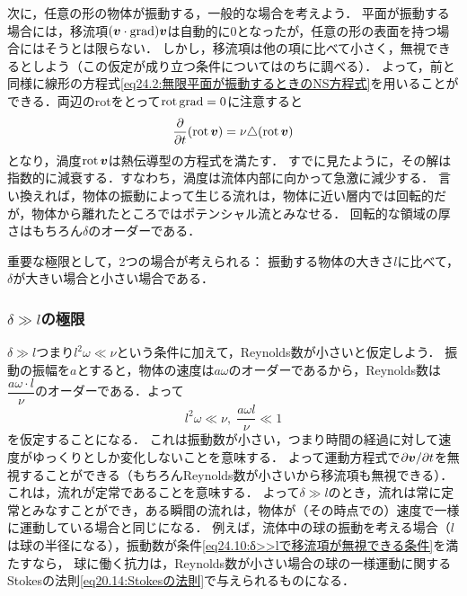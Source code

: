 次に，任意の形の物体が振動する，一般的な場合を考えよう．
平面が振動する場合には，移流項$(\vb*{v}\cdot\operatorname{grad})\vb*{v}$は自動的に0となったが，任意の形の表面を持つ場合にはそうとは限らない．
しかし，移流項は他の項に比べて小さく，無視できるとしよう（この仮定が成り立つ条件についてはのちに調べる）．
よって，前と同様に線形の方程式\eqref{eq24.2:無限平面が振動するときのNS方程式}を用いることができる．両辺のrotをとって$\operatorname{rot}\operatorname{grad}=0$に注意すると
\begin{equation}\label{eq24.9:渦度に対する熱伝導型の方程式}
    \pdv{t} (\operatorname{rot}\vb*{v}) = \nu \triangle(\operatorname{rot}\vb*{v})
\end{equation}
となり，渦度$\operatorname{rot}\vb*{v}$は熱伝導型の方程式を満たす．
すでに見たように，その解は指数的に減衰する．すなわち，渦度は流体内部に向かって急激に減少する．
言い換えれば，物体の振動によって生じる流れは，物体に近い層内では回転的だが，物体から離れたところではポテンシャル流とみなせる．
回転的な領域の厚さはもちろん$\delta$のオーダーである．

重要な極限として，2つの場合が考えられる：
振動する物体の大きさ$l$に比べて，$\delta$が大きい場合と小さい場合である．


\subsubsection*{$\delta \gg l$の極限}
$\delta \gg l$つまり$l^2\omega \ll \nu$という条件に加えて，Reynolds数が小さいと仮定しよう．
振動の振幅を$a$とすると，物体の速度は$a\omega$のオーダーであるから，Reynolds数は$\dfrac{a\omega\cdot l}{\nu}$のオーダーである．よって
\begin{equation}\label{eq24.10:δ>>lで移流項が無視できる条件}
    l^2\omega \ll \nu , \; \frac{a\omega l}{\nu} \ll 1
\end{equation}
を仮定することになる．
これは振動数が小さい，つまり時間の経過に対して速度がゆっくりとしか変化しないことを意味する．
よって運動方程式で$\partial\vb*{v}/\partial t$を無視することができる（もちろんReynolds数が小さいから移流項も無視できる）．
これは，流れが定常であることを意味する．
よって$\delta \gg l$のとき，流れは常に定常とみなすことができ，ある瞬間の流れは，物体が（その時点での）速度で一様に運動している場合と同じになる．
例えば，流体中の球の振動を考える場合（$l$は球の半径になる），振動数が条件\eqref{eq24.10:δ>>lで移流項が無視できる条件}を満たすなら，
球に働く抗力は，Reynolds数が小さい場合の球の一様運動に関するStokesの法則\eqref{eq20.14:Stokesの法則}で与えられるものになる．






